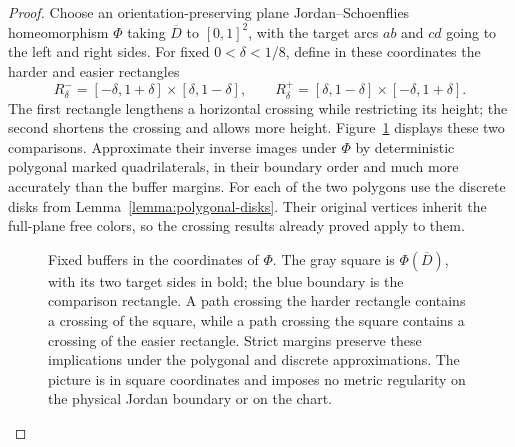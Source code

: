 \begin{proof}
Choose an orientation-preserving plane Jordan--Schoenflies homeomorphism
$\Phi$ taking $\overline D$ to $[0,1]^2$, with the target arcs $ab$ and
$cd$ going to the left and right sides. For fixed $0<\delta<1/8$, define
in these coordinates the harder and easier rectangles
\[
 R^-_\delta=[-\delta,1+\delta]\times[\delta,1-\delta],
 \qquad
 R^+_\delta=[\delta,1-\delta]\times[-\delta,1+\delta].
\]
The first rectangle lengthens a horizontal crossing while restricting
its height; the second shortens the crossing and allows more height.
Figure~\ref{fig:jordan-buffers} displays these two comparisons.
Approximate their inverse images under $\Phi$ by deterministic polygonal
marked quadrilaterals, in their boundary order and much more accurately
than the buffer margins. For each of the two polygons use the discrete
disks from Lemma~\ref{lemma:polygonal-disks}. Their original vertices
inherit the full-plane free colors, so the crossing results already
proved apply to them.

\begin{figure}[htbp]
\centering
{}
\caption{Fixed buffers in the coordinates of $\Phi$. The gray square is
$\Phi(\overline D)$, with its two target sides in bold; the blue boundary
is the comparison rectangle. A path crossing the harder rectangle
contains a crossing of the square, while a path crossing the square
contains a crossing of the easier rectangle. Strict margins preserve
these implications under the
polygonal and discrete approximations. The picture is in square
coordinates and imposes no metric regularity on the physical Jordan
boundary or on the chart.}
\label{fig:jordan-buffers}
\end{figure}


\end{proof}
